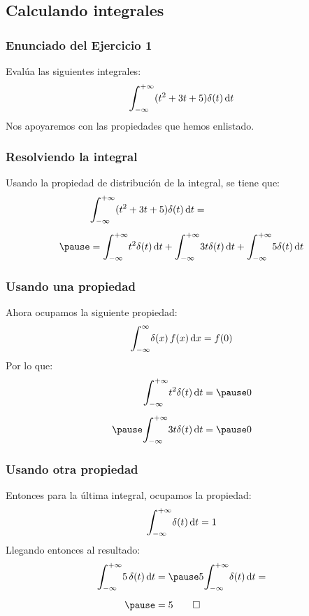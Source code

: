 \documentclass[12pt]{beamer}
\begin{document}
\subsection{Calculando integrales}

\begin{frame}
\frametitle{Enunciado del Ejercicio 1}
Evalúa las siguientes integrales:
\pause
\begin{align*}
\scaleint{6ex}_{\bs -\infty}^{+\infty} (t^{2} + 3 t + 5) \delta (t) \dd{t}
\end{align*}
\pause
Nos apoyaremos con las propiedades que hemos enlistado.
\end{frame}

\begin{frame}
\frametitle{Resolviendo la integral}
Usando la propiedad de distribución de la integral, se tiene que:
\pause
\begin{eqnarray*}
\begin{aligned}
&\scaleint{6ex}_{\bs -\infty}^{+\infty} (t^{2} + 3 t + 5) \delta (t) \dd{t} = \\[0.5em] \pause
&= \scaleint{6ex}_{\bs -\infty}^{+\infty} t^{2} \delta (t) \dd{t} + \scaleint{6ex}_{\bs -\infty}^{+\infty} 3 t \delta (t) \dd{t} + \scaleint{6ex}_{\bs -\infty}^{+\infty} 5 \delta (t) \dd{t}
\end{aligned}
\end{eqnarray*}
\end{frame}

\begin{frame}
\frametitle{Usando una propiedad}
Ahora ocupamos la siguiente propiedad:
\pause
\begin{align*}
\scaleint{6ex}_{\bs -\infty}^{\infty} \delta (x) \, f (x) \dd{x} = f (0)
\end{align*}
\pause
Por lo que:
\begin{eqnarray*}
\begin{aligned}
\scaleint{6ex}_{\bs -\infty}^{+\infty} t^{2} \delta (t) \dd{t} = \pause 0 \\[0.5em] \pause
\scaleint{6ex}_{\bs -\infty}^{+\infty} 3 t \delta (t) \dd{t} =  \pause 0
\end{aligned}
\end{eqnarray*}
\end{frame}

\begin{frame}
\frametitle{Usando otra propiedad}
Entonces para la última integral, ocupamos la propiedad:
\pause
\begin{align*}
\scaleint{6ex}_{\bs -\infty}^{+\infty} \delta (t) \dd{t} =  1
\end{align*}
\pause
Llegando entonces al resultado:
\begin{eqnarray*}
\begin{aligned}
\scaleint{6ex}_{\bs -\infty}^{+\infty} 5 \, \delta (t) \dd{t} &= \pause 5 \scaleint{6ex}_{\bs -\infty}^{+\infty} \delta (t) \dd{t} = \\[0.5em] \pause
&= 5 \qed
\end{aligned}
\end{eqnarray*}
\end{frame}
\end{document}
